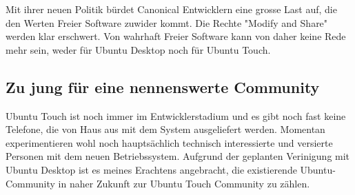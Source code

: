 Mit ihrer neuen Politik bürdet Canonical Entwicklern eine grosse Last auf, die den Werten Freier Software zuwider kommt. Die Rechte "Modify and Share" werden klar erschwert\thinspace\cite{online:ubuntutouch-mjgLicense}. Von wahrhaft Freier Software kann von daher keine Rede mehr sein, weder für Ubuntu Desktop noch für Ubuntu Touch.\\

\subsection{Zu jung für eine nennenswerte Community}
Ubuntu Touch ist noch immer im Entwicklerstadium und es gibt noch fast keine Telefone, die von Haus aus mit dem System ausgeliefert werden\thinspace\cite{online:ubuntutouch-wikipedia}. Momentan experimentieren wohl noch hauptsächlich technisch interessierte und versierte Personen mit dem neuen Betriebssystem. Aufgrund der geplanten Verinigung mit Ubuntu Desktop ist es meines Erachtens angebracht, die existierende Ubuntu-Community in naher Zukunft zur Ubuntu Touch Community zu zählen.